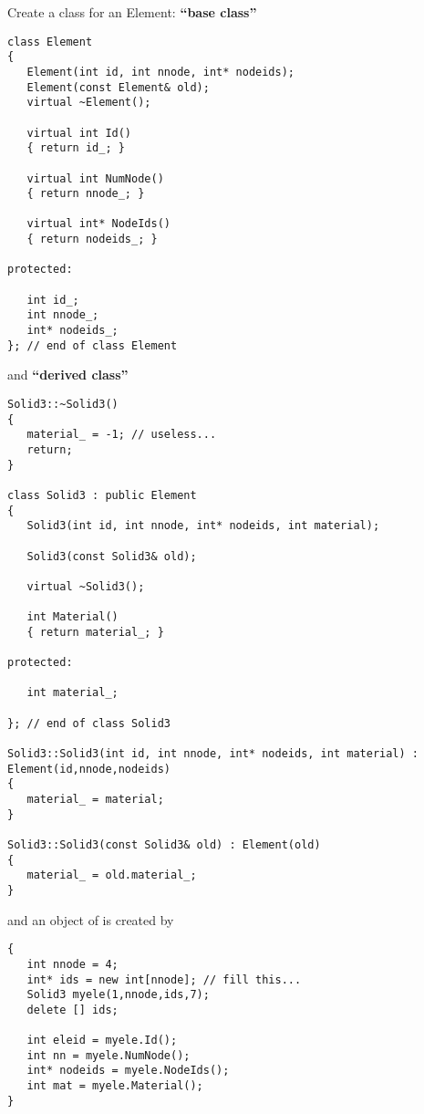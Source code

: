Create a class for an Element: \textbf{``base class''}\\
\begin{boxedminipage}{\linewidth}
\begin{verbatim}
class Element
{
   Element(int id, int nnode, int* nodeids);
   Element(const Element& old);
   virtual ~Element();
   
   virtual int Id()
   { return id_; }

   virtual int NumNode()
   { return nnode_; }

   virtual int* NodeIds()
   { return nodeids_; }

protected:

   int id_;
   int nnode_;
   int* nodeids_;
}; // end of class Element
\end{verbatim}
\end{boxedminipage}
and \textbf{``derived class''}\\
\begin{boxedminipage}{\linewidth}
\begin{verbatim}
Solid3::~Solid3()
{
   material_ = -1; // useless...
   return;
}

class Solid3 : public Element
{
   Solid3(int id, int nnode, int* nodeids, int material);

   Solid3(const Solid3& old);

   virtual ~Solid3();

   int Material()
   { return material_; }

protected:

   int material_;
   
}; // end of class Solid3

Solid3::Solid3(int id, int nnode, int* nodeids, int material) : Element(id,nnode,nodeids)
{
   material_ = material;
}

Solid3::Solid3(const Solid3& old) : Element(old)
{
   material_ = old.material_;      
}
\end{verbatim}
\end{boxedminipage}
and an object of  is created by\\
\begin{boxedminipage}{\linewidth}
\begin{verbatim}
{
   int nnode = 4;
   int* ids = new int[nnode]; // fill this...
   Solid3 myele(1,nnode,ids,7);
   delete [] ids;

   int eleid = myele.Id();
   int nn = myele.NumNode();
   int* nodeids = myele.NodeIds();
   int mat = myele.Material();
}
\end{verbatim}
\end{boxedminipage}

